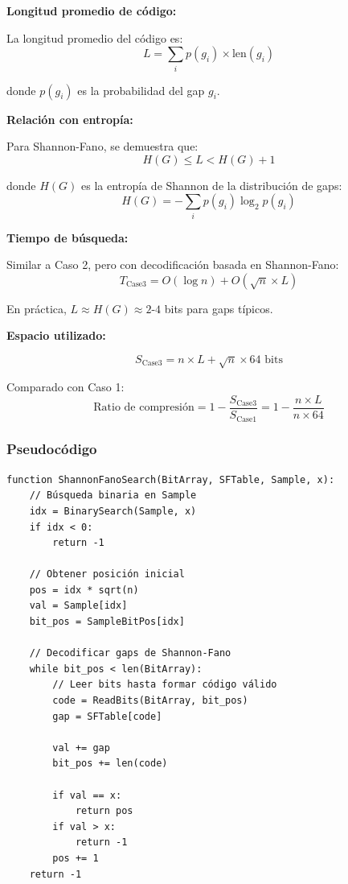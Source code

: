 \documentclass[11pt, twocolumn]{article}
\begin{document}
\textbf{Longitud promedio de código:}

La longitud promedio del código es:
\begin{equation}
L = \sum_{i} p(g_i) \times \text{len}(g_i)
\end{equation}

donde $p(g_i)$ es la probabilidad del gap $g_i$.

\textbf{Relación con entropía:}

Para Shannon-Fano, se demuestra que:
\begin{equation}
H(G) \le L < H(G) + 1
\end{equation}

donde $H(G)$ es la entropía de Shannon de la distribución de gaps:
\begin{equation}
H(G) = -\sum_{i} p(g_i) \log_2 p(g_i)
\end{equation}

\textbf{Tiempo de búsqueda:}

Similar a Caso 2, pero con decodificación basada en Shannon-Fano:
\begin{equation}
T_{\text{Case3}} = O(\log n) + O(\sqrt{n} \times L)
\end{equation}

En práctica, $L \approx H(G) \approx 2$-$4$ bits para gaps típicos.

\textbf{Espacio utilizado:}

\begin{equation}
S_{\text{Case3}} = n \times L + \sqrt{n} \times 64 \text{ bits}
\end{equation}

Comparado con Caso 1:
\begin{equation}
\text{Ratio de compresión} = 1 - \frac{S_{\text{Case3}}}{S_{\text{Case1}}} = 1 - \frac{n \times L}{n \times 64}
\end{equation}

\subsubsection{Pseudocódigo}

\begin{lstlisting}
function ShannonFanoSearch(BitArray, SFTable, Sample, x):
    // Búsqueda binaria en Sample
    idx = BinarySearch(Sample, x)
    if idx < 0:
        return -1

    // Obtener posición inicial
    pos = idx * sqrt(n)
    val = Sample[idx]
    bit_pos = SampleBitPos[idx]

    // Decodificar gaps de Shannon-Fano
    while bit_pos < len(BitArray):
        // Leer bits hasta formar código válido
        code = ReadBits(BitArray, bit_pos)
        gap = SFTable[code]

        val += gap
        bit_pos += len(code)

        if val == x:
            return pos
        if val > x:
            return -1
        pos += 1
    return -1
\end{lstlisting}
\end{document}
